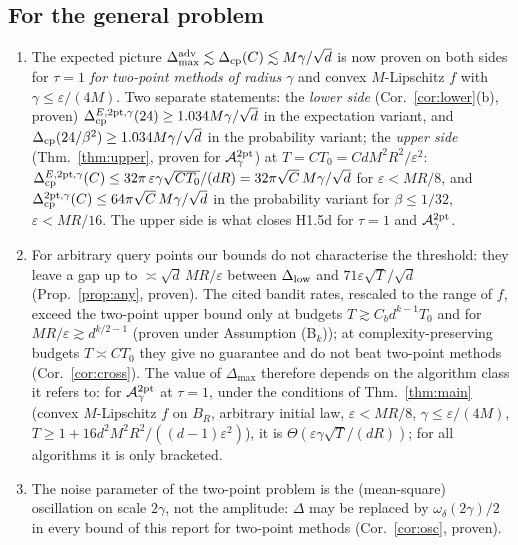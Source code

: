 \documentclass[11pt,a4paper]{article}
\numberwithin{equation}{section}
\theoremstyle{definition}
\theoremstyle{remark}
\newcommand{\Dmax}{\Delta_{\max}}\newcommand{\Dcp}{\Delta_{\rm cp}}\newcommand{\Dlow}{\Delta_{\rm low}}
\begin{document}
\subsection{For the general problem}
\begin{enumerate}
\item The expected picture $\Delta^{\rm adv}_{\max}\lesssim\Dcp(C)\lesssim M\gamma/\sqrt d$ is now proven on both sides for $\tau=1$ \emph{for two-point methods of radius $\gamma$} and convex $M$-Lipschitz $f$ with $\gamma\le\varepsilon/(4M)$. Two separate statements: the \emph{lower side} (Cor.~\ref{cor:lower}(b), proven) $\Dcp^{E,\mathrm{2pt},\gamma}(24)\ge1.034M\gamma/\sqrt d$ in the expectation variant, and $\Dcp(24/\beta^2)\ge1.034M\gamma/\sqrt d$ in the probability variant; the \emph{upper side} (Thm.~\ref{thm:upper}, proven for $\mathcal A^{\rm 2pt}_\gamma$) at $T=CT_0=CdM^2R^2/\varepsilon^2$: $\Dcp^{E,\mathrm{2pt},\gamma}(C)\le32\pi\,\varepsilon\gamma\sqrt{CT_0}/(dR)=32\pi\sqrt C\,M\gamma/\sqrt d$ for $\varepsilon<MR/8$, and $\Dcp^{\mathrm{2pt},\gamma}(C)\le64\pi\sqrt C\,M\gamma/\sqrt d$ in the probability variant for $\beta\le1/32$, $\varepsilon<MR/16$. The upper side is what closes H1.5d for $\tau=1$ and $\mathcal A^{\rm 2pt}_\gamma$.
\item For arbitrary query points our bounds do not characterise the threshold: they leave a gap up to $\asymp\sqrt d\,MR/\varepsilon$ between $\Dlow$ and $71\varepsilon\sqrt T/\sqrt d$ (Prop.~\ref{prop:any}, proven). The cited bandit rates, rescaled to the range of $f$, exceed the two-point upper bound only at budgets $T\gtrsim C_bd^{k-1}T_0$ and for $MR/\varepsilon\gtrsim d^{k/2-1}$ (proven under Assumption (B$_k$)); at complexity-preserving budgets $T\asymp CT_0$ they give no guarantee and do not beat two-point methods (Cor.~\ref{cor:cross}). The value of $\Dmax$ therefore depends on the algorithm class it refers to: for $\mathcal A^{\rm 2pt}_\gamma$ at $\tau=1$, under the conditions of Thm.~\ref{thm:main} (convex $M$-Lipschitz $f$ on $B_R$, arbitrary initial law, $\varepsilon<MR/8$, $\gamma\le\varepsilon/(4M)$, $T\ge1+16d^2M^2R^2/((d-1)\varepsilon^2)$), it is $\Theta(\varepsilon\gamma\sqrt T/(dR))$; for all algorithms it is only bracketed.
\item The noise parameter of the two-point problem is the (mean-square) oscillation on scale $2\gamma$, not the amplitude: $\Delta$ may be replaced by $\omega_\delta(2\gamma)/2$ in every bound of this report for two-point methods (Cor.~\ref{cor:osc}, proven).
\end{enumerate}
\end{document}
